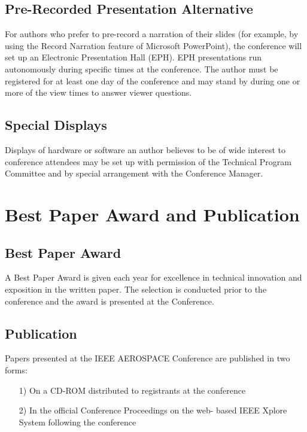\documentclass[twocolumn,letterpaper]{IEEEAerospaceCLS}  %
\begin{document}
\subsection{Pre-Recorded Presentation Alternative}
For authors who prefer to pre-record a narration of their slides (for example, by using the Record Narration feature of Microsoft PowerPoint), the conference will set up an Electronic Presentation Hall (EPH). EPH presentations run autonomously during specific times at the conference. The author must be registered for at least one day of the conference and may stand by during one or more of the view times to answer viewer questions.

\subsection{Special Displays}
Displays of hardware or software an author believes to be of wide interest to conference attendees may be set up with permission of the Technical Program Committee and by special arrangement with the Conference Manager.

\section{Best Paper Award and Publication}
\subsection{Best Paper Award}
A Best Paper Award is given each year for excellence in technical innovation and exposition in the written paper. The selection is conducted prior to the conference and the award is presented at the Conference.

\subsection{Publication}
Papers presented at the IEEE AEROSPACE Conference are published in two forms:
\begin{itemize}
  \item [1)] On a CD-ROM distributed to registrants at the conference \\
  \item [2)] In the official Conference Proceedings on the web- based IEEE Xplore System following the conference
\end{itemize}
\end{document}

